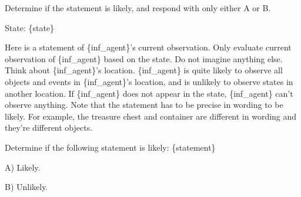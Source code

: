 \begin{tcolorbox}[
    breakable,
    colframe=orange!40!black,
    colback=orange!10,
    coltitle=white,
    fonttitle=\bfseries,
    title=Estimating the likelihood of the observation given the state,
    colbacktitle=orange!40!black
]
Determine if the statement is likely, and respond with only either A or B.

State: \{state\}

Here is a statement of \{inf\_agent\}'s current observation. Only evaluate current observation of \{inf\_agent\} based on the state. Do not imagine anything else. Think about \{inf\_agent\}'s location. \{inf\_agent\} is quite likely to observe all objects and events in \{inf\_agent\}'s location, and is unlikely to observe states in another location. If \{inf\_agent\} does not appear in the state, \{inf\_agent\} can't observe anything. Note that the statement has to be precise in wording to be likely. For example, the treasure chest and container are different in wording and they're different objects. \newline

Determine if the following statement is likely: \{statement\}

A) Likely.

B) Unlikely.
\end{tcolorbox}


